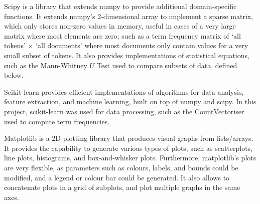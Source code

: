 \documentclass{report}
\begin{document}
Scipy \cite{Scipy} is a library that extends numpy to provide additional domain-specific functions. It extends numpy's 2-dimensional array to implement a sparse matrix, which only stores non-zero values in memory, useful in cases of a very large matrix where most elements are zero; such as a term frequency matrix of `all tokens' $\times$ `all documents' where most documents only contain values for a very small subset of tokens.
It also provides implementations of statistical equations, such as the Mann-Whitney $U$ Test used to compare subsets of data, defined below. 

Scikit-learn \cite{Scikit-learn} provides efficient implementations of algorithms for data analysis, feature extraction, and machine learning, built on top of numpy and scipy.
In this project, scikit-learn was used for data processing, such as the CountVectoriser used to compute term frequencies.

Matplotlib \cite{Matplotlib} is a 2D plotting library that produces visual graphs from lists/arrays.
It provides the capability to generate various types of plots, such as scatterplots, line plots, histograms, and box-and-whisker plots.
Furthermore, matplotlib's plots are very flexible, as parameters such as colours, labels, and bounds could be modified, and a legend or colour bar could be generated.
It also allows to concatenate plots in a grid of subplots, and plot multiple graphs in the same axes.
\end{document}

